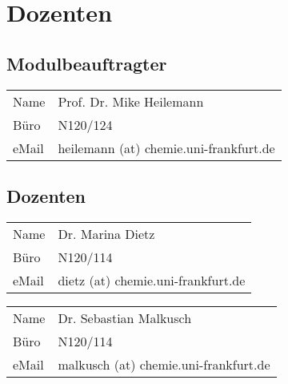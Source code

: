 \section{Dozenten}
\subsection*{Modulbeauftragter}
\begin{tabular}{ll}
Name & Prof. Dr. Mike Heilemann\\
Büro & N120/124\\
eMail & heilemann (at) chemie.uni-frankfurt.de
\end{tabular}

\subsection*{Dozenten}
\begin{tabular}{ll}
Name & Dr. Marina Dietz\\
Büro & N120/114\\
eMail & dietz (at) chemie.uni-frankfurt.de
\end{tabular}

\vspace{0.5cm} 

\noindent
\begin{tabular}{ll}
Name & Dr. Sebastian Malkusch\\
Büro & N120/114\\
eMail & malkusch (at) chemie.uni-frankfurt.de
\end{tabular}